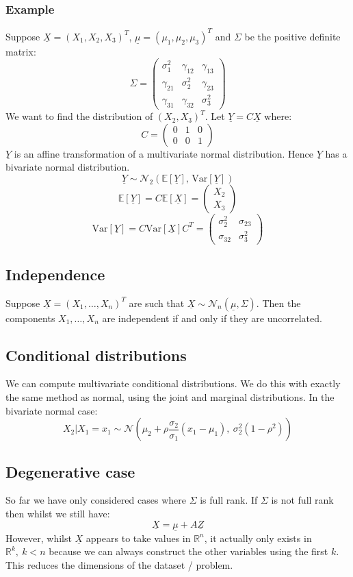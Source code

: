 \documentclass[12pt]{article}
\begin{document}
\subsubsection*{Example}
Suppose \(\underline{X}=(X_1,X_2,X_3)^T\), \(\underline{\mu}=(\mu_1,\mu_2,\mu_3)^T\) and \(\Sigma\) be the positive definite matrix:
\[\Sigma=\begin{pmatrix}
    \sigma_1^2 & \gamma_{12} & \gamma_{13} \\
    \gamma_{21} & \sigma_{2}^2 & \gamma_{23} \\
    \gamma_{31} & \gamma_{32} & \sigma_{3}^2
\end{pmatrix}\]
We want to find the distribution of \((X_2,X_3)^T\). Let \(\underline{Y}=C\underline{X}\) where:
\[C=\begin{pmatrix}
    0 & 1 & 0 \\
    0 & 0 & 1
\end{pmatrix}\]
\(\underline{Y}\) is an affine transformation of a multivariate normal distribution. Hence \(\underline{Y}\) has a bivariate normal distribution.
\[\underline{Y}\sim\mathcal{N}_2(\mathbb{E}[\underline{Y}],\, \text{Var}[\underline{Y}])\]
\[\mathbb{E}[\underline{Y}]=C\mathbb{E}[\underline{X}]=\begin{pmatrix}
    X_2 \\
    X_3
\end{pmatrix}\]
\[\text{Var}[\underline{Y}]=C\text{Var}[\underline{X}]C^T=\begin{pmatrix}
    \sigma_2^2 & \sigma_{23} \\
    \sigma_{32} & \sigma_3^2
\end{pmatrix}\]
\subsection{Independence}
Suppose \(\underline{X}=(X_1,\dots,X_n)^T\) are such that \(\underline{X}\sim\mathcal{N}_n(\underline{\mu}, \Sigma)\). Then the components \(X_1,\dots ,X_n\) are independent if and only if they are uncorrelated.
\subsection{Conditional distributions}
We can compute multivariate conditional distributions. We do this with exactly the same method as normal, using the joint and marginal distributions. In the bivariate normal case:
\[X_2|X_1=x_1\sim \mathcal{N}(\mu_2+\rho\frac{\sigma_2}{\sigma_1}(x_1-\mu_1),\  \sigma_2^2(1-\rho^2))\]
\subsection{Degenerative case}
So far we have only considered cases where \(\Sigma\) is full rank. If \(\Sigma\) is not full rank then whilst we still have:
\[\underline{X}=\underline{\mu}+A\underline{Z}\]
However, whilst \(\underline{X}\) appears to take values in \(\mathbb{R}^n\), it actually only exists in \(\mathbb{R}^k,\ k<n\) because we can always construct the other variables using the first \(k\). This reduces the dimensions of the dataset / problem.
\clearpage
\end{document}
